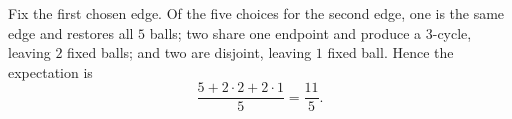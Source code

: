 Fix the first chosen edge. Of the five choices for the second edge, one is the same edge and restores all $5$ balls; two share one endpoint and produce a 3-cycle, leaving $2$ fixed balls; and two are disjoint, leaving $1$ fixed ball. Hence the expectation is
\[
\boxed{\dfrac{5+2\cdot2+2\cdot1}{5}=\dfrac{11}{5}}.
\]
